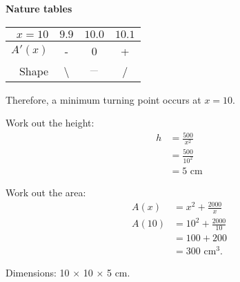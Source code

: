 \begin{enumerate}
	\textbf{Nature tables}
	
	\medskip
	
	\begin{tabular}{r | c c c}
		$x=10$ & $9.9$ & $10.0$ & $10.1$\\
		\hline
		$A'(x)$ & - & 0 & +\\
		Shape & \textbackslash & $_{\text{---}}$ & / \\
	\end{tabular}

	Therefore, a minimum turning point occurs at $x=10$.
	
	Work out the height:
	\begin{align*}
		h &= \frac{500}{x^2}\\
		&= \frac{500}{10^2}\\
		&= 5\text{ cm}
	\end{align*}
	
	Work out the area:
	\begin{align*}
		A(x) &= x^2+\frac{2000}{x}\\
		A(10) &= 10^2+\frac{2000}{10}\\
		&= 100+200\\
		&= 300\text{ cm}^3\text{.}
	\end{align*}
	
	Dimensions: 10 $\times$ 10 $\times$ 5 cm.
\end{enumerate}
